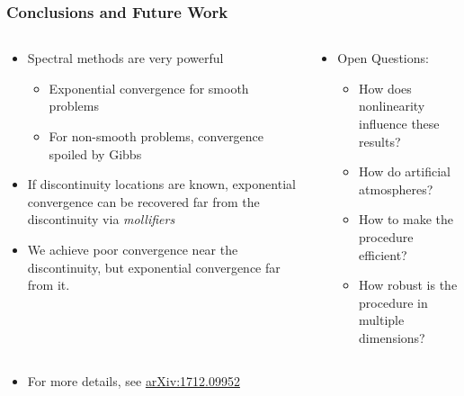 \documentclass[9pt,usepdftitle=false,aspectratio=169]{beamer}
\newcommand{\backupbegin}{ %
  \newcounter{finalframe}
  \setcounter{finalframe}{\value{framenumber}}
}
\newcommand{\backupend}{ %
  \setcounter{framenumber}{\value{finalframe}}
}
\begin{document}
\begin{frame}
  \frametitle{Conclusions and Future Work}
  \begin{columns}
    \begin{column}{.5\textwidth}
      \begin{itemize}
      \item Spectral methods are very powerful
        \begin{itemize}
        \item Exponential convergence for smooth problems
        \item For non-smooth problems, convergence spoiled by Gibbs
        \end{itemize}
      \item If discontinuity locations are known, exponential
        convergence can be recovered far from the discontinuity via
        \textit{mollifiers}
      \item We achieve poor convergence near the discontinuity, but
        exponential convergence far from it.
      \end{itemize}
    \end{column}
    \begin{column}{.5\textwidth}
      \begin{itemize}
      \item Open Questions:
        \begin{itemize}
        \item How does nonlinearity influence these results?
        \item How do artificial atmospheres?
        \item How to make the procedure efficient?
        \item How robust is the procedure in multiple dimensions?
        \end{itemize}
      \end{itemize}
    \end{column}
  \end{columns}
  \vspace{1cm}
  \begin{itemize}
    \item For more details, see
      {\color{blue}\href{https://arxiv.org/abs/1712.09952}{arXiv:1712.09952}}
    \end{itemize}
\end{frame}

\backupbegin

\backupend
\end{document}
